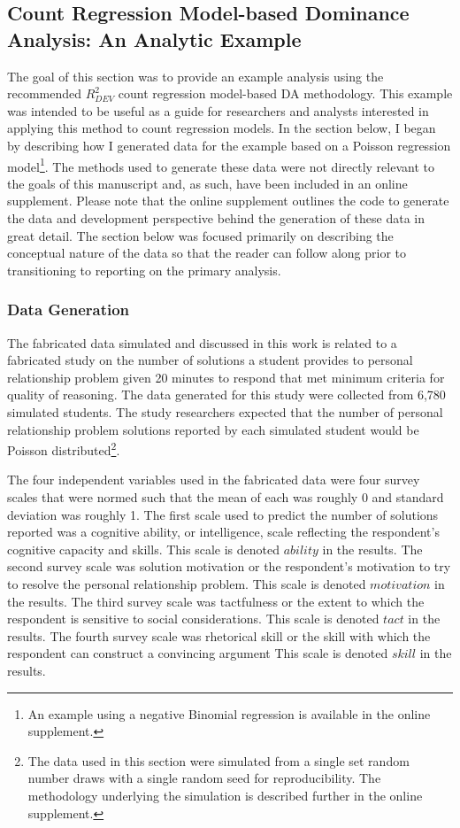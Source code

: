 \documentclass[man]{apa7}
\begin{document}
	\subsection{Count Regression Model-based Dominance Analysis: An Analytic Example}
	
	The goal of this section was to provide an example analysis using the recommended $R^2_{DEV}$ count regression model-based DA methodology.
	This example was intended to be useful as a guide for researchers and analysts interested in applying this method to count regression models.
	In the section below, I began by describing how I generated data for the example based on a Poisson regression model\footnote{
		An example using a negative Binomial regression is available in the online supplement.}.
	The methods used to generate these data were not directly relevant to the goals of this manuscript and, as such, have been included in an online supplement.
	Please note that the online supplement outlines the code to generate the data and development perspective behind the generation of these data in great detail.
	The section below was focused primarily on describing the conceptual nature of the data so that the reader can follow along prior to transitioning to reporting on the primary analysis.

		\subsubsection{Data Generation}
	
	The fabricated data simulated and discussed in this work is related to a fabricated study on the number of solutions a student provides to personal relationship problem given 20 minutes to respond that met minimum criteria for quality of reasoning.
	The data generated for this study were collected from 6,780 simulated students.
	The study researchers expected that the number of personal relationship problem solutions reported by each simulated student would be Poisson distributed\footnote{The data used in this section were simulated from a single set random number draws with a single random seed for reproducibility. The methodology underlying the simulation is described further in the online supplement.}.
	
	The four independent variables used in the fabricated data were four survey scales that were normed such that the mean of each was roughly 0 and standard deviation was roughly 1. 
	The first scale used to predict the number of solutions reported was a cognitive ability, or intelligence, scale reflecting the respondent's cognitive capacity and skills.
	This scale is denoted $ability$ in the results.
	The second survey scale was solution motivation or the respondent's motivation to try to resolve the personal relationship problem.
	This scale is denoted $motivation$ in the results.
	The third survey scale was tactfulness or the extent to which the respondent is sensitive to social considerations.	
	This scale is denoted $tact$ in the results.
	The fourth survey scale was rhetorical skill or the skill with which the respondent can construct a convincing argument
	This scale is denoted $skill$ in the results.
	
\end{document}
